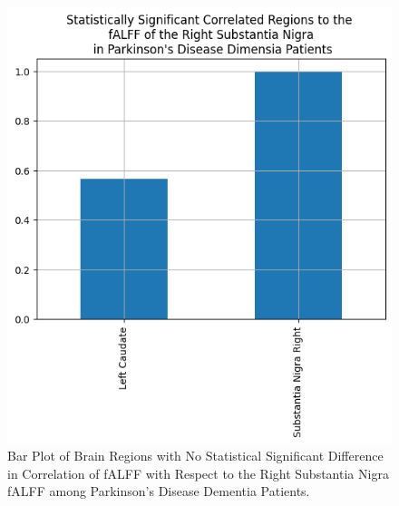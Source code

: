 \documentclass[12pt]{article}
\begin{document}
\begin{figure}[h]  %
    \centering
    \includegraphics[width=\textwidth]{"../img/statistically_significant_correlated_regions_sn_pdd.png"}  %
    \caption{Bar Plot of Brain Regions with No Statistical Significant Difference in Correlation of fALFF with Respect to the Right Substantia Nigra fALFF among Parkinson's Disease Dementia Patients.}
    \label{fig:pdd}  %
\end{figure}

\FloatBarrier
\end{document}
